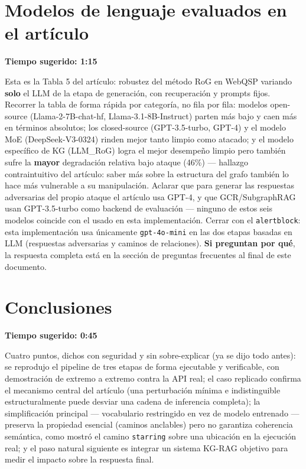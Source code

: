 \documentclass[11pt]{article}
\newcommand{\tiempo}[1]{{\small\color{timecolor}\textbf{Tiempo sugerido: #1}}\par\vspace{0.3em}}
\begin{document}
\section{Modelos de lenguaje evaluados en el artículo}
\tiempo{1:15}
Esta es la Tabla 5 del artículo: robustez del método RoG en WebQSP variando \textbf{solo}
el LLM de la etapa de generación, con recuperación y prompts fijos. Recorrer la tabla de
forma rápida por categoría, no fila por fila: modelos open-source (Llama-2-7B-chat-hf,
Llama-3.1-8B-Instruct) parten más bajo y caen más en términos absolutos; los closed-source
(GPT-3.5-turbo, GPT-4) y el modelo MoE (DeepSeek-V3-0324) rinden mejor tanto limpio como
atacado; y el modelo específico de KG (LLM\_RoG) logra el mejor desempeño limpio pero
también sufre la \textbf{mayor} degradación relativa bajo ataque (46\%) --- hallazgo
contraintuitivo del artículo: saber más sobre la estructura del grafo también lo hace más
vulnerable a su manipulación. Aclarar que para generar las respuestas adversarias del
propio ataque el artículo usa GPT-4, y que GCR/SubgraphRAG usan GPT-3.5-turbo como backend
de evaluación --- ninguno de estos seis modelos coincide con el usado en esta
implementación. Cerrar con el \texttt{alertblock}: esta implementación usa únicamente
\texttt{gpt-4o-mini} en las dos etapas basadas en LLM (respuestas adversarias y caminos de
relaciones). \textbf{Si preguntan por qué}, la respuesta completa está en la sección de
preguntas frecuentes al final de este documento.

\section{Conclusiones}
\tiempo{0:45}
Cuatro puntos, dichos con seguridad y sin sobre-explicar (ya se dijo todo antes): se
reprodujo el pipeline de tres etapas de forma ejecutable y verificable, con demostración de
extremo a extremo contra la API real; el caso replicado confirma el mecanismo central del
artículo (una perturbación mínima e indistinguible estructuralmente puede desviar una
cadena de inferencia completa); la simplificación principal --- vocabulario restringido en
vez de modelo entrenado --- preserva la propiedad esencial (caminos anclables) pero no
garantiza coherencia semántica, como mostró el camino \texttt{starring} sobre una ubicación
en la ejecución real; y el paso natural siguiente es integrar un sistema KG-RAG objetivo
para medir el impacto sobre la respuesta final.
\end{document}
